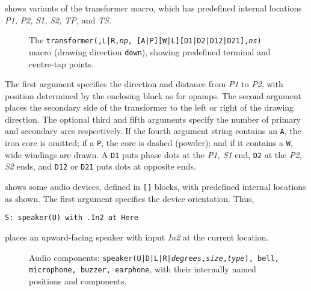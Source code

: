 \pagebreak
{} shows variants of the transformer macro,
which has predefined internal locations
{\sl P1,} {\sl P2,} {\sl S1,} {\sl S2,} {\sl TP,} and {\sl TS.}
\begin{figure}[h!t]
   
  \caption{The {\tt transformer(\linespec,L|R,{\sl np},%
[A|P][W|L][D1|D2|D12|D21],{\sl ns})}
     macro (drawing direction {\tt down}), showing predefined terminal
     and centre-tap points.}
   \label{Xform}
   \end{figure}
The first argument
specifies the direction and distance from {\sl P1} to {\sl P2}, with
position determined by the enclosing block as for opamps.  The second
argument places the secondary side of the transformer to the left
or right of the drawing direction.  The optional third and fifth arguments
specify the number of primary and secondary arcs respectively.
If the fourth argument string contains an {\tt A}, the iron core
is omitted; 
if a {\tt P}, the core is dashed (powder);
and if it contains a {\tt W}, wide windings are drawn.
A {\tt D1} puts phase dots at the {\sl P1, S1} end, {\tt D2} at the
{\sl P2, S2} ends, and {\tt D12} or {\tt D21} puts dots at opposite ends.

 shows some audio devices, defined in {\tt []} blocks,
with predefined internal locations as shown.
The first argument specifies the device orientation.
Thus,
\par
{\tt S: speaker(U) with .In2 at Here}

\noindent
places an upward-facing speaker with input {\sl In2} at the
current location.
\begin{figure}[ht]
   
   \caption{Audio components:
   {\tt speaker(U|D|L|R|{\sl degrees},{\sl size},{\sl type}),
     bell, microphone, buzzer,
     earphone}, with their internally named positions and components.}
   \label{Audio}
   \end{figure}

